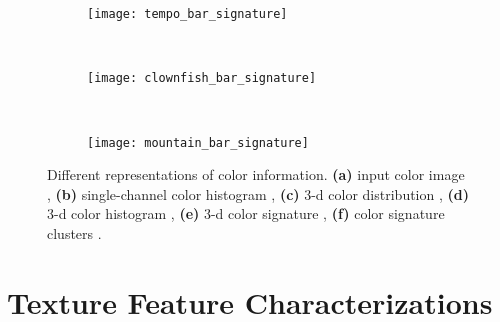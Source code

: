 \begin{figure}[!ht]
    \begin{subfigure}[t]{\textwidth+20pt\relax}
    	\makebox[20pt]{\raisebox{25pt}{}}%
    	\texttt{[image: tempo\_bar\_signature]}
    \end{subfigure}~ 
    \begin{subfigure}[b]{0.32\textwidth}
        \texttt{[image: clownfish\_bar\_signature]}
    \end{subfigure}~
    \begin{subfigure}[b]{0.32\textwidth}
        \texttt{[image: mountain\_bar\_signature]}
    \end{subfigure}
                    
	\caption{Different representations of color information. {\small \textsf{\textbf{(a)}}} input color image , {\small \textsf{\textbf{(b)}}} single-channel color histogram , {\small \textsf{\textbf{(c)}}} 3-d color distribution , {\small \textsf{\textbf{(d)}}} 3-d color histogram , {\small \textsf{\textbf{(e)}}} 3-d color signature , {\small \textsf{\textbf{(f)}}} color signature clusters .}\label{fig:color_image_representations}    
\end{figure}


\section{Texture Feature Characterizations}

